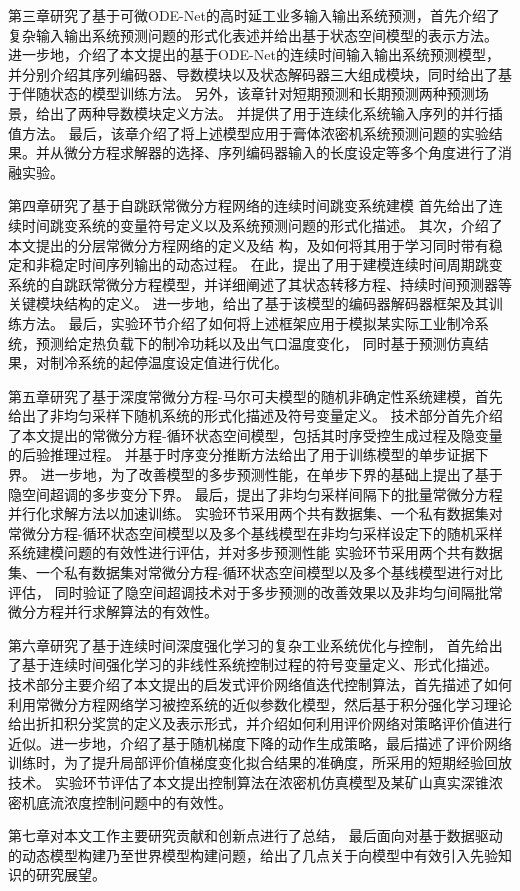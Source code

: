 第三章研究了基于可微ODE-Net的高时延工业多输入输出系统预测，首先介绍了复杂输入输出系统预测问题的形式化表述并给出基于状态空间模型的表示方法。
进一步地，介绍了本文提出的基于ODE-Net的连续时间输入输出系统预测模型，并分别介绍其序列编码器、导数模块以及状态解码器三大组成模块，同时给出了基于伴随状态的模型训练方法。
另外，该章针对短期预测和长期预测两种预测场景，给出了两种导数模块定义方法。
并提供了用于连续化系统输入序列的并行插值方法。
最后，该章介绍了将上述模型应用于膏体浓密机系统预测问题的实验结果。并从微分方程求解器的选择、序列编码器输入的长度设定等多个角度进行了消融实验。

第四章研究了基于自跳跃常微分方程网络的连续时间跳变系统建模
首先给出了连续时间跳变系统的变量符号定义以及系统预测问题的形式化描述。
其次，介绍了本文提出的分层常微分方程网络的定义及结
构，及如何将其用于学习同时带有稳定和非稳定时间序列输出的动态过程。
在此，提出了用于建模连续时间周期跳变系统的自跳跃常微分方程模型，并详细阐述了其状态转移方程、持续时间预测器等关键模块结构的定义。
进一步地，给出了基于该模型的编码器解码器框架及其训练方法。
最后，实验环节介绍了如何将上述框架应用于模拟某实际工业制冷系统，预测给定热负载下的制冷功耗以及出气口温度变化，
同时基于预测仿真结果，对制冷系统的起停温度设定值进行优化。

第五章研究了基于深度常微分方程-马尔可夫模型的随机非确定性系统建模，首先给出了非均匀采样下随机系统的形式化描述及符号变量定义。
技术部分首先介绍了本文提出的常微分方程-循环状态空间模型，包括其时序受控生成过程及隐变量的后验推理过程。
并基于时序变分推断方法给出了用于训练模型的单步证据下界。
进一步地，为了改善模型的多步预测性能，在单步下界的基础上提出了基于隐空间超调的多步变分下界。
最后，提出了非均匀采样间隔下的批量常微分方程并行化求解方法以加速训练。
实验环节采用两个共有数据集、一个私有数据集对常微分方程-循环状态空间模型以及多个基线模型在非均匀采样设定下的随机采样系统建模问题的有效性进行评估，并对多步预测性能
实验环节采用两个共有数据集、一个私有数据集对常微分方程-循环状态空间模型以及多个基线模型进行对比评估，
同时验证了隐空间超调技术对于多步预测的改善效果以及非均匀间隔批常微分方程并行求解算法的有效性。


第六章研究了基于连续时间深度强化学习的复杂工业系统优化与控制，
首先给出了基于连续时间强化学习的非线性系统控制过程的符号变量定义、形式化描述。
技术部分主要介绍了本文提出的启发式评价网络值迭代控制算法，首先描述了如何利用常微分方程网络学习被控系统的近似参数化模型，然后基于积分强化学习理论给出折扣积分奖赏的定义及表示形式，并介绍如何利用评价网络对策略评价值进行近似。进一步地，介绍了基于随机梯度下降的动作生成策略，最后描述了评价网络训练时，为了提升局部评价值梯度变化拟合结果的准确度，所采用的短期经验回放技术。
实验环节评估了本文提出控制算法在浓密机仿真模型及某矿山真实深锥浓密机底流浓度控制问题中的有效性。


第七章对本文工作主要研究贡献和创新点进行了总结，
最后面向对基于数据驱动的动态模型构建乃至世界模型构建问题，给出了几点关于向模型中有效引入先验知识的研究展望。
